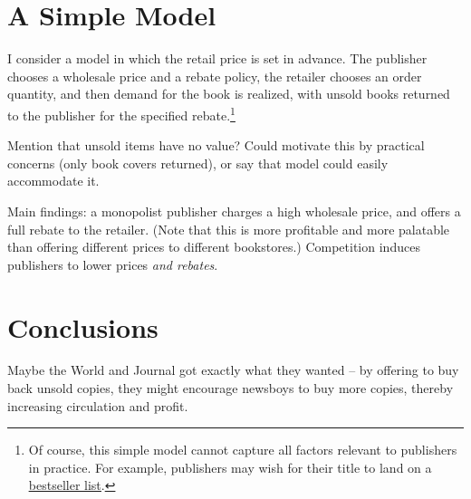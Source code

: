 \documentclass[11pt, oneside]{article}   	%
\newcommand{\link}[2]{{\color{blue} \href{#1}{\underline{#2}}}}
\begin{document}

\section{A Simple Model}

I consider a model in which the retail price is set in advance. The publisher chooses a wholesale price and a rebate policy, the retailer chooses an order quantity, and then demand for the book is realized, with unsold books returned to the publisher for the specified rebate.\footnote{Of course, this simple model cannot capture all factors relevant to publishers in practice. For example, publishers may wish for their title to land on a \link{http://independentpublisher.com/article.php?page=987}{bestseller list}.}

{\color{blue} Mention that unsold items have no value? Could motivate this by practical concerns (only book covers returned), or say that model could easily accommodate it.}

Main findings: a monopolist publisher charges a high wholesale price, and offers a full rebate to the retailer. (Note that this is more profitable and more palatable than offering different prices to different bookstores.) Competition induces publishers to lower prices {\em and rebates}.

\section{Conclusions}

Maybe the World and Journal got exactly what they wanted -- by offering to buy back unsold copies, they might encourage newsboys to buy more copies, thereby increasing circulation and profit.
\end{document}
